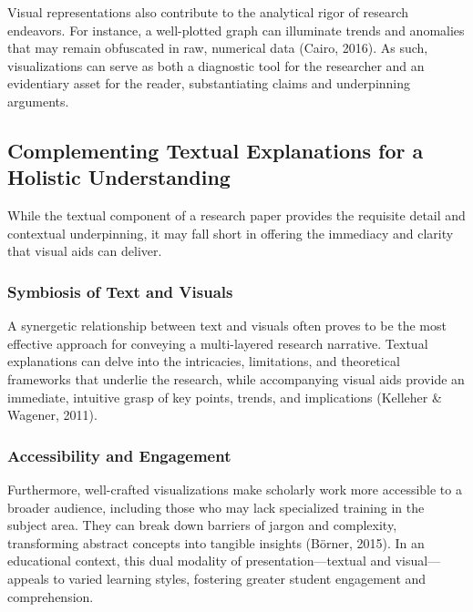\documentclass[
  b5paper]{book}
\begin{document}
Visual representations also contribute to the analytical rigor of research endeavors. For instance, a well-plotted graph can illuminate trends and anomalies that may remain obfuscated in raw, numerical data (Cairo, 2016). As such, visualizations can serve as both a diagnostic tool for the researcher and an evidentiary asset for the reader, substantiating claims and underpinning arguments.

\hypertarget{complementing-textual-explanations-for-a-holistic-understanding}{%
\subsection{Complementing Textual Explanations for a Holistic Understanding}\label{complementing-textual-explanations-for-a-holistic-understanding}}

While the textual component of a research paper provides the requisite detail and contextual underpinning, it may fall short in offering the immediacy and clarity that visual aids can deliver.

\hypertarget{symbiosis-of-text-and-visuals}{%
\subsubsection{Symbiosis of Text and Visuals}\label{symbiosis-of-text-and-visuals}}

A synergetic relationship between text and visuals often proves to be the most effective approach for conveying a multi-layered research narrative. Textual explanations can delve into the intricacies, limitations, and theoretical frameworks that underlie the research, while accompanying visual aids provide an immediate, intuitive grasp of key points, trends, and implications (Kelleher \& Wagener, 2011).

\hypertarget{accessibility-and-engagement}{%
\subsubsection{Accessibility and Engagement}\label{accessibility-and-engagement}}

Furthermore, well-crafted visualizations make scholarly work more accessible to a broader audience, including those who may lack specialized training in the subject area. They can break down barriers of jargon and complexity, transforming abstract concepts into tangible insights (Börner, 2015). In an educational context, this dual modality of presentation---textual and visual---appeals to varied learning styles, fostering greater student engagement and comprehension.
\end{document}
